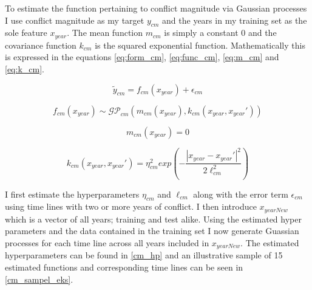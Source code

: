 \documentclass[a4paper]{article}
\begin{document}
To estimate the function pertaining to conflict magnitude via Gaussian processes I use conflict magnitude as my target $y_{cm}$ and the years in my training set as the sole feature $x_{year}$. The mean function $m_{cm}$ is simply a constant $0$ and the covariance function $k_{cm}$ is the squared exponential function. Mathematically this is expressed in the equations \ref{eq:form_cm}, \ref{eq:func_cm}, \ref{eq:m_cm} and \ref{eq:k_cm}.\par


\[
\tilde{y}_{cm} = f_{cm}(x_{year}) + \epsilon_{cm} \tag{19} \label{eq:form_cm}
\]

\[
f_{cm}(x_{year}) \sim \mathcal{GP}_{cm}(m_{cm}(x_{year}),k_{cm}(x_{year},x_{year}')) \tag{20} \label{eq:func_cm}
\]

\[
m_{cm}(x_{year}) = 0 \tag{21} \label{eq:m_cm}
\]

\[
k_{cm}(x_{year},x_{year}') = \eta_{cm}^2 exp\left(-\frac{|x_{year}-x_{year}'|^2}{2\ell_{cm}^2}\right) \tag{22} \label{eq:k_cm}
\]

I first estimate the hyperparameters $\eta_{cm}$ and $\ell_{cm}$ along with the error term $\epsilon_{cm}$ using time lines with two or more years of conflict. I then introduce $x_{yearNew}$ which is a vector of all years; training and test alike. Using the estimated hyper parameters and the data contained in the training set I now generate Guassian processes for each time line across all years included in $x_{yearNew}$. The estimated hyperparameters can be found in \autoref{cm_hp} and an illustrative sample of 15 estimated functions and corresponding time lines can be seen in \autoref{cm_sampel_eks}.
\end{document}
